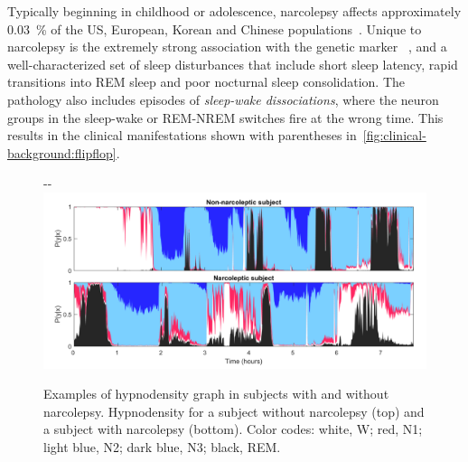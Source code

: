 Typically beginning in childhood or adolescence, narcolepsy affects approximately \SI{0.03}{\percent} of the US, European, Korean and Chinese populations~\cite{Kornum2017}.
Unique to narcolepsy is the extremely strong association with the genetic marker \hla~\cite{Han2014}, and a well-characterized set of sleep disturbances that include short sleep latency, rapid transitions into \ac{REM} sleep and poor nocturnal sleep consolidation.
The pathology also includes episodes of \textit{sleep-wake dissociations}, where the neuron groups in the sleep-wake or \ac{REM}-\ac{NREM} switches fire at the wrong time.
This results in the clinical manifestations shown with parentheses in~\cref{fig:clinical-background:flipflop}.
\begin{figure}[t]
    \begin{adjustwidth*}{}{-\marginparwidth-\marginparsep}
        \includegraphics[width=\textwidth+\marginparwidth+\marginparsep]{figures/paper-iii/Figure_3.png}
        \caption[Examples of hypnodensity graphs.]{Examples of hypnodensity graph in subjects with and without narcolepsy. 
        Hypnodensity for a subject without narcolepsy (top) and a subject with narcolepsy (bottom). 
        Color codes: white, \ac{W}; red, \ac{N1}; light blue, \ac{N2}; dark blue, \ac{N3}; black, \ac{REM}.}
        \label{fig:paperiii-figure03}
    \end{adjustwidth*}
\end{figure}

